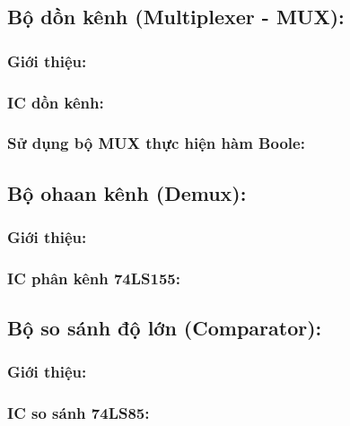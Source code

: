 \subsection{Bộ dồn kênh (Multiplexer - MUX):}
\subsubsection{Giới thiệu:}
\subsubsection{IC dồn kênh:}
\subsubsection{Sử dụng bộ MUX thực hiện hàm Boole:}
\subsection{Bộ ohaan kênh (Demux):}
\subsubsection{Giới thiệu:}
\subsubsection{IC phân kênh 74LS155:}
\subsection{Bộ so sánh độ lớn (Comparator):}
\subsubsection{Giới thiệu:}
\subsubsection{IC so sánh 74LS85:}